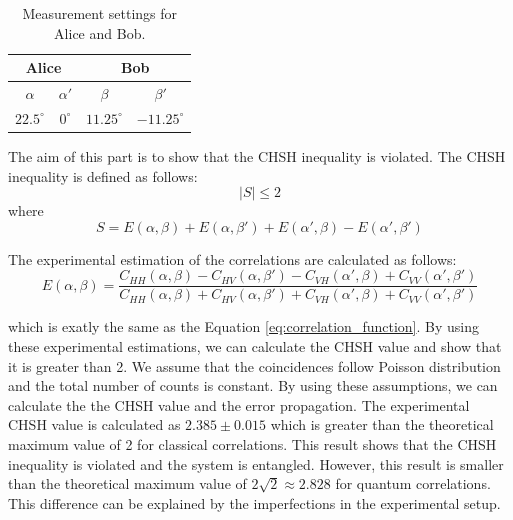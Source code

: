 \begin{table}[h!]
    \centering
    \begin{tabular}{|c|c|c|c|}
        \hline
        \multicolumn{2}{|c|}{Alice} & \multicolumn{2}{c|}{Bob} \\ \hline
        $\alpha$ & $\alpha'$ & $\beta$ & $\beta'$ \\ \hline
        $22.5^\circ$ & $0^\circ$ & $11.25^\circ$ & $-11.25^\circ$ \\ \hline
    \end{tabular}
    \caption{Measurement settings for Alice and Bob.}
    \label{tab:measurement_settings}
\end{table}

The aim of this part is to show that the CHSH inequality is violated. 
The CHSH inequality is defined as follows\cite{chsh}:
\begin{equation}
    |S| \leq 2
\end{equation}
where
\begin{equation}
    S = E(\alpha, \beta) + E(\alpha, \beta') + E(\alpha', \beta) - E(\alpha', \beta')
\end{equation}

The experimental estimation of the correlations are calculated as follows:
\begin{equation}
    E(\alpha, \beta) = \frac{C_{HH}(\alpha,\beta) - C_{HV}(\alpha,\beta') - C_{VH}(\alpha',\beta) + C_{VV}(\alpha',\beta')}{C_{HH}(\alpha,\beta) + C_{HV}(\alpha,\beta') + C_{VH}(\alpha',\beta) + C_{VV}(\alpha',\beta')}
\end{equation}

which is exatly the same as the Equation \ref{eq:correlation_function}.
By using these experimental estimations, we can calculate the CHSH value and show that it is greater than 2.
We assume that the coincidences follow Poisson distribution and the total number of counts
is constant. By using these assumptions, we can calculate the the CHSH value and the error propagation.
The experimental CHSH value is calculated as $2.385 \pm0.015 $ which is greater than the theoretical
maximum value of 2 for classical correlations. This result shows that the CHSH inequality is 
violated and the system is entangled. However, this result is smaller than the 
theoretical maximum value of $2\sqrt{2} \approx 2.828$ for quantum correlations. 
This difference can be explained by the imperfections in the experimental setup.






